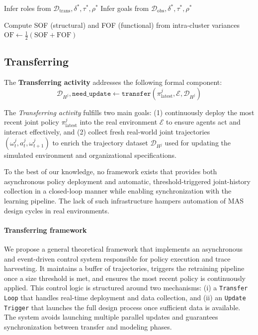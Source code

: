 \documentclass[pdflatex,sn-mathphys-num]{sn-jnl}%
\theoremstyle{thmstyleone}%
\theoremstyle{thmstyletwo}%
\theoremstyle{thmstylethree}%
\begin{document}
\begin{algorithm}[H]
{    }
    
    Infer roles from $\mathcal{D}_{\text{trans}}, \delta^*, \tau^*, \rho^*$ \;
    Infer goals from $\mathcal{D}_{\text{obs}}, \delta^*, \tau^*, \rho^*$ \;
    
    Compute SOF (structural) and FOF (functional) from intra-cluster variances \;
    $\text{OF} \gets \frac{1}{2}(\text{SOF} + \text{FOF})$ \;
    
\end{algorithm}


\subsection{Transferring}\label{sec:transferring}

\noindent The \textbf{Transferring activity} addresses the following formal component:
\[
    \mathcal{D}_{H^j}, \texttt{need\_update} \gets \texttt{transfer}(\pi^j_{\text{latest}}, \mathcal{E}, \mathcal{D}_{H^j})
\]

The \textit{Transferring activity} fulfills two main goals: (1) continuously deploy the most recent joint policy $\pi^j_{\text{latest}}$ into the real environment $\mathcal{E}$ to ensure agents act and interact effectively, and (2) collect fresh real-world joint trajectories $(\omega^j_t, a^j_t, \omega^j_{t+1})$ to enrich the trajectory dataset $\mathcal{D}_{H^j}$ used for updating the simulated environment and organizational specifications.

To the best of our knowledge, no framework exists that provides both asynchronous policy deployment and automatic, threshold-triggered joint-history collection in a closed-loop manner while enabling synchronization with the learning pipeline. The lack of such infrastructure hampers automation of MAS design cycles in real environments.

\paragraph{Transferring framework}
We propose a general theoretical framework that implements an asynchronous and event-driven control system responsible for policy execution and trace harvesting. It maintains a buffer of trajectories, triggers the retraining pipeline once a size threshold is met, and ensures the most recent policy is continuously applied. This control logic is structured around two mechanisms:
(i) a \texttt{Transfer Loop} that handles real-time deployment and data collection, and
(ii) an \texttt{Update Trigger} that launches the full design process once sufficient data is available. The system avoids launching multiple parallel updates and guarantees synchronization between transfer and modeling phases.
\end{document}
